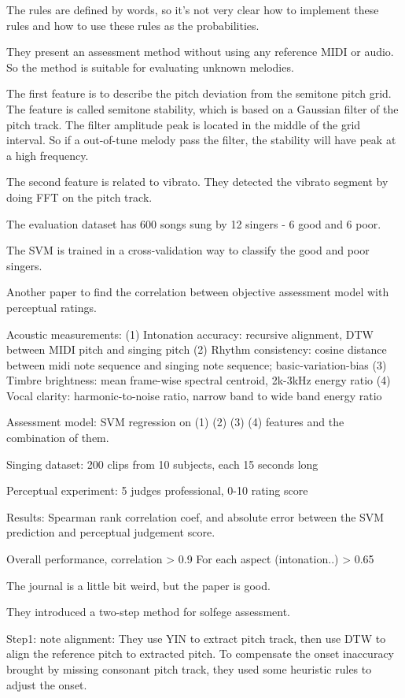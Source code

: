 The rules are defined by words, so it's not very clear how to implement these rules and how to use these rules as the probabilities.

 They present an assessment method without using any reference MIDI or audio. So the method is suitable for evaluating unknown melodies.

The first feature is to describe the pitch deviation from the semitone pitch grid. The feature is called semitone stability, which is based on a Gaussian filter of the pitch track. The filter amplitude peak is located in the middle of the grid interval. So if a out-of-tune melody pass the filter, the stability will have peak at a high frequency.

The second feature is related to vibrato. They detected the vibrato segment by doing FFT on the pitch track.

The evaluation dataset has 600 songs sung by 12 singers - 6 good and 6 poor.

The SVM is trained in a cross-validation way to classify the good and poor singers.

 Another paper to find the correlation between objective assessment model with perceptual ratings.

Acoustic measurements:
(1) Intonation accuracy: recursive alignment, DTW between MIDI pitch and singing pitch
(2) Rhythm consistency: cosine distance between midi note sequence and singing note sequence; basic-variation-bias
(3) Timbre brightness: mean frame-wise spectral centroid, 2k-3kHz energy ratio
(4) Vocal clarity: harmonic-to-noise ratio, narrow band to wide band energy ratio

Assessment model:
SVM regression on (1) (2) (3) (4) features and the combination of them.

Singing dataset:
200 clips from 10 subjects, each 15 seconds long

Perceptual experiment:
5 judges professional, 0-10 rating score

Results:
Spearman rank correlation coef, and absolute error between the SVM prediction and perceptual judgement score.

Overall performance, correlation > 0.9
For each aspect (intonation..) > 0.65

 The journal is a little bit weird, but the paper is good.

They introduced a two-step method for solfege assessment.

Step1: note alignment: They use YIN to extract pitch track, then use DTW to align the reference pitch to extracted pitch. To compensate the onset inaccuracy brought by missing consonant pitch track, they used some heuristic rules to adjust the onset.

